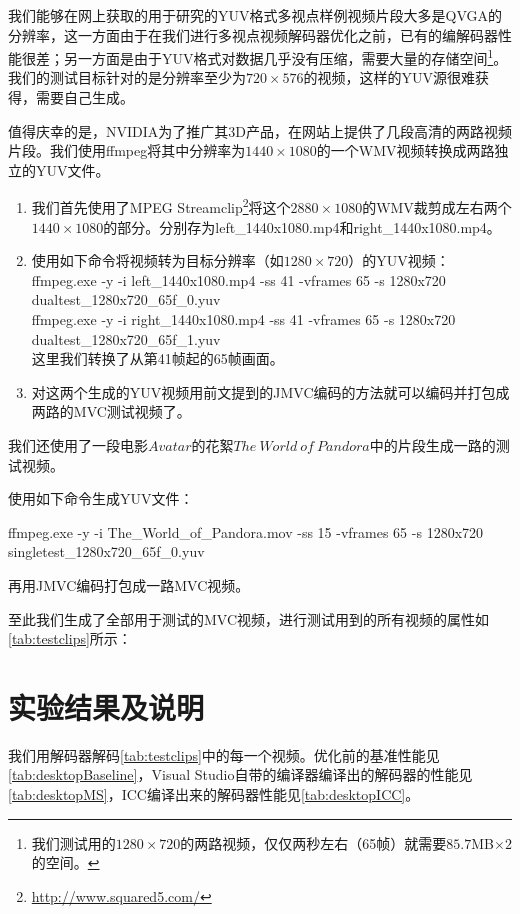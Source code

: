 我们能够在网上获取的用于研究的YUV格式多视点样例视频片段大多是QVGA的分辨率，这一方面由于在我们进行多视点视频解码器优化之前，已有的编解码器性能很差；另一方面是由于YUV格式对数据几乎没有压缩，需要大量的存储空间\footnote{我们测试用的$1280\times 720$的两路视频，仅仅两秒左右（65帧）就需要$85.7$MB$\times2$的空间。}。我们的测试目标针对的是分辨率至少为$720\times 576$的视频，这样的YUV源很难获得，需要自己生成。

值得庆幸的是，NVIDIA为了推广其3D产品，在网站上提供了几段高清的两路视频片段。我们使用ffmpeg将其中分辨率为$1440\times 1080$的一个WMV视频转换成两路独立的YUV文件。
\begin{enumerate}
\item 我们首先使用了MPEG Streamclip\footnote{\url{http://www.squared5.com/}}将这个$2880\times 1080$的WMV裁剪成左右两个$1440\times 1080$的部分。分别存为left\_1440x1080.mp4和right\_1440x1080.mp4。
\item 使用如下命令将视频转为目标分辨率（如$1280\times 720$）的YUV视频：\\
ffmpeg.exe -y -i left\_1440x1080.mp4 -ss 41 -vframes 65 -s 1280x720 dualtest\_1280x720\_65f\_0.yuv\\
ffmpeg.exe -y -i right\_1440x1080.mp4 -ss 41 -vframes 65 -s 1280x720 dualtest\_1280x720\_65f\_1.yuv\\
这里我们转换了从第41帧起的65帧画面。
\item 对这两个生成的YUV视频用前文提到的JMVC编码的方法就可以编码并打包成两路的MVC测试视频了。
\end{enumerate}

我们还使用了一段电影$\mathit{Avatar}$的花絮$\mathit{The\ World\ of\ Pandora}$中的片段生成一路的测试视频。

使用如下命令生成YUV文件：

ffmpeg.exe -y -i The\_World\_of\_Pandora.mov -ss 15 -vframes 65 -s 1280x720 singletest\_1280x720\_65f\_0.yuv

再用JMVC编码打包成一路MVC视频。

至此我们生成了全部用于测试的MVC视频，进行测试用到的所有视频的属性如\autoref{tab:testclips}所示：



\section{实验结果及说明}
\label{sec:optresult}

我们用解码器解码\autoref{tab:testclips}中的每一个视频。优化前的基准性能见\autoref{tab:desktopBaseline}，Visual Studio自带的编译器编译出的解码器的性能见\autoref{tab:desktopMS}，ICC编译出来的解码器性能见\autoref{tab:desktopICC}。

